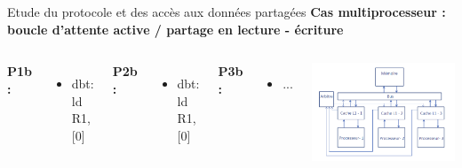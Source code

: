 \documentclass{beamer}
\begin{document}
\begin{frame}{Etude du protocole et des accès aux données partagées}
    \textbf{Cas multiprocesseur : boucle d’attente active / partage en lecture - \hspace*{3.8cm} écriture}
    \begin{columns}[c] %

        \textbf{P1b : }
        \begin{itemize}
            \item dbt: ld R1, [0]
        \end{itemize}

        \textbf{P2b : }
        \begin{itemize}
            \item dbt: ld R1, [0]
        \end{itemize}

        \textbf{P3b : }
        \begin{itemize}
            \item ...
        \end{itemize}

        \vspace{1cm}
        \includegraphics[scale=0.3]{archi.png}
        
    \end{columns}
\end{frame}
\end{document}
